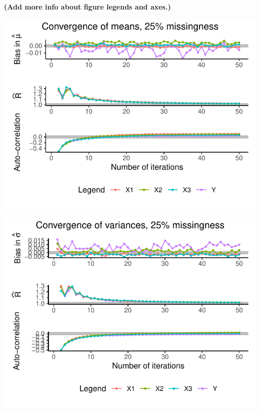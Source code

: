 \documentclass[Royal,times,sageh]{sagej}
\begin{document}
\textbf{(Add more info about figure legends and axes.)}

\begin{flushleft}\includegraphics{manuscript_files/figure-latex/unnamed-chunk-3-1} \end{flushleft}

\begin{flushleft}\includegraphics{manuscript_files/figure-latex/unnamed-chunk-4-1} \end{flushleft}
\end{document}
